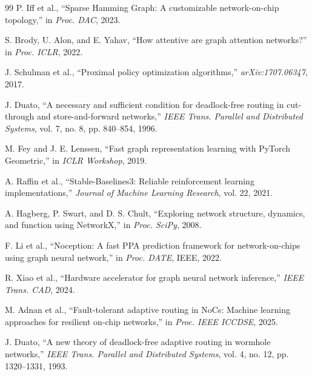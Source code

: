 \documentclass[conference]{IEEEtran}
\begin{document}
\begin{thebibliography}{99}
P. Iff et al., ``Sparse Hamming Graph: A customizable network-on-chip topology,'' in \textit{Proc. DAC}, 2023.

S. Brody, U. Alon, and E. Yahav, ``How attentive are graph attention networks?'' in \textit{Proc. ICLR}, 2022.

J. Schulman et al., ``Proximal policy optimization algorithms,'' \textit{arXiv:1707.06347}, 2017.

J. Duato, ``A necessary and sufficient condition for deadlock-free routing in cut-through and store-and-forward networks,'' \textit{IEEE Trans. Parallel and Distributed Systems}, vol. 7, no. 8, pp. 840--854, 1996.

M. Fey and J. E. Lenssen, ``Fast graph representation learning with PyTorch Geometric,'' in \textit{ICLR Workshop}, 2019.

A. Raffin et al., ``Stable-Baselines3: Reliable reinforcement learning implementations,'' \textit{Journal of Machine Learning Research}, vol. 22, 2021.

A. Hagberg, P. Swart, and D. S. Chult, ``Exploring network structure, dynamics, and function using NetworkX,'' in \textit{Proc. SciPy}, 2008.

F. Li et al., ``Noception: A fast PPA prediction framework for network-on-chips using graph neural network,'' in \textit{Proc. DATE}, IEEE, 2022.

R. Xiao et al., ``Hardware accelerator for graph neural network inference,'' \textit{IEEE Trans. CAD}, 2024.

M. Adnan et al., ``Fault-tolerant adaptive routing in NoCs: Machine learning approaches for resilient on-chip networks,'' in \textit{Proc. IEEE ICCDSE}, 2025.

J. Duato, ``A new theory of deadlock-free adaptive routing in wormhole networks,'' \textit{IEEE Trans. Parallel and Distributed Systems}, vol. 4, no. 12, pp. 1320--1331, 1993.

\end{thebibliography}
\end{document}
